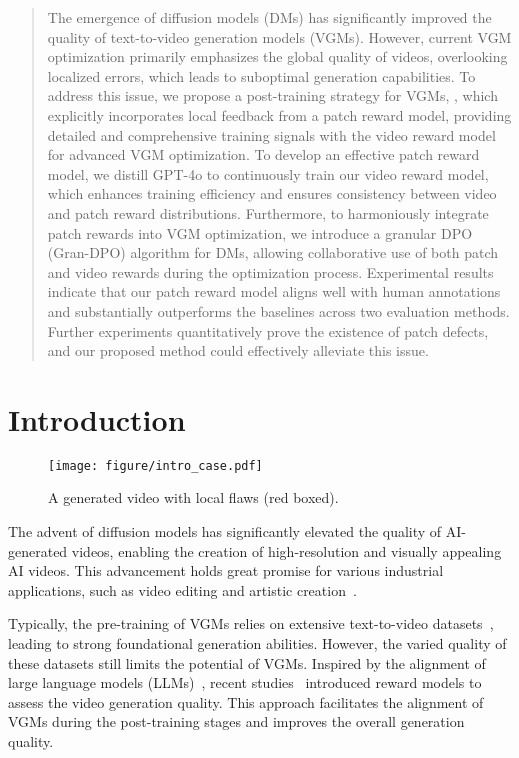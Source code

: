 \begin{abstract}
The emergence of diffusion models (DMs) has significantly improved the quality of text-to-video generation models (VGMs). However, current VGM optimization primarily emphasizes the global quality of videos, overlooking localized errors, which leads to suboptimal generation capabilities. 
To address this issue, we propose a post-training strategy for VGMs, \ours{}, which explicitly incorporates local feedback from a patch reward model, providing detailed and comprehensive training signals with the video reward model for advanced VGM optimization. 
To develop an effective patch reward model, we distill GPT-4o to continuously train our video reward model, which enhances training efficiency and ensures consistency between video and patch reward distributions. Furthermore, to harmoniously integrate patch rewards into VGM optimization, we introduce a granular DPO (Gran-DPO) algorithm for DMs, allowing collaborative use of both patch and video rewards during the optimization process.
Experimental results indicate that our patch reward model aligns well with human annotations and \ours{} substantially outperforms the baselines across two evaluation methods. Further experiments quantitatively prove the existence of patch defects, and our proposed method could effectively alleviate this issue.
\end{abstract}

\section{Introduction}\label{sec:intro}
\begin{figure}
    \centering
    \texttt{[image: figure/intro\_case.pdf]}
    \caption{A generated video with local flaws (red boxed). 
    }
    \vspace{-0.5cm}
    \label{fig:patch-defect-case}
\end{figure}

The advent of diffusion models has significantly elevated the quality of AI-generated videos, enabling the creation of high-resolution and visually appealing AI videos. 
This advancement holds great promise for various industrial applications, such as video editing and artistic creation~\cite{Pictory,runwayml,synthesia}.

Typically, the pre-training of VGMs relies on extensive text-to-video datasets~\cite{webvid-1m}, leading to strong foundational generation abilities. However, the varied quality of these datasets still limits the potential of VGMs. 
Inspired by the alignment of large language models (LLMs)~\cite{rlhf}, recent studies~\cite{t2v-turbo} introduced reward models to assess the video generation quality. This approach facilitates the alignment of VGMs during the post-training stages and improves the overall generation quality. 

